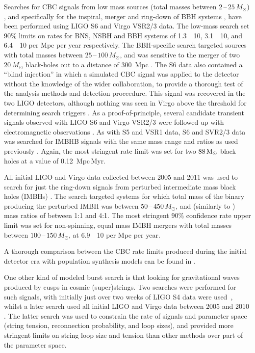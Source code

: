 Searches for CBC signals from low mass sources (total masses between $2$\,--\,$25\,M_{\odot}$) 
\cite{2012PhRvD..85h2002A}, and specifically for the inspiral, merger and ring-down of BBH systems 
\cite{2013PhRvD..87b2002A}, have been performed using LIGO S6 and Virgo VSR2/3 data. The low-mass search set 
90\% limits on rates for BNS, NSBH and BBH systems of 1.3~\texttimes~10, 
3.1~\texttimes~10, and 6.4~\texttimes~10 per Mpc per year respectively. The 
BBH-specific search targeted sources with total masses between $25$\,--\,$100\,M_{\odot}$, and was sensitive 
to the merger of two $20~M_{\odot}$ black-holes out to a distance of 300~Mpc \cite{2013PhRvD..87b2002A}. The 
S6 data also contained a ``blind injection'' in which a simulated CBC signal was applied to the detector 
without the knowledge of the wider collaboration, to provide a thorough test of the analysis methods and 
detection proceedure. This signal was recovered in the two LIGO detectors, although nothing was seen in Virgo 
above the threshold for determining search triggers \cite{2012PhRvD..85h2002A}. As a proof-of-principle,
several candidate transient signals observed with LIGO S6 and Virgo VSR2/3 were followed-up with 
electromagnetic observations \cite{2012A&A...539A.124L, 2012A&A...541A.155A, 2012ApJS..203...28E, 
2014ApJS..211....7A}. As with S5 and VSR1 data, S6 and SVR2/3 data was searched for IMBHB signals with the 
same mass range and ratios as used previously \cite{2014PhRvD..89l2003A}. Again, the most stringent rate 
limit was set for two $88\,{\rm M}_{\odot}$ black holes at a value of 0.12~Mpc\,Myr.

All initial LIGO and Virgo data collected between 2005 and 2011 was used to search for just the ring-down 
signals from perturbed intermediate mass black holes (IMBHs) \cite{2014PhRvD..89j2006A}. The search targeted 
systems for which total mass of the binary producing the perturbed IMBH was between 
$50$\,--\,$450\,M_{\odot}$, and (similarly to \cite{2012PhRvD..85j2004A}) mass ratios of between 1:1 and 4:1. 
The most stringent 90\% confidence rate upper limit was set for non-spinning, equal mass IMBH mergers with 
total masses between $100$\,--\,$150\,M_{\odot}$, at 6.9~\texttimes~10 per Mpc per year.

A thorough comparison between the CBC rate limits produced during the initial detector era with population 
synthesis models can be found in \cite{2016ApJ...819..108B}.

One other kind of modeled burst search is that looking for gravitational waves produced by cusps in cosmic 
(super)strings. Two searches were performed for such signals, with initially just over two weeks of LIGO S4 
data were used~\cite{Abbott:2009j}, whilst a later search used all initial LIGO and Virgo data between 2005 
and 2010 \cite{2014PhRvL.112m1101A}. The latter search \cite{2014PhRvL.112m1101A} was used to constrain the 
rate of signals and parameter space (string tension, reconnection probability, and loop sizes), and provided 
more stringent limits on string loop size and tension than other methods over part of the parameter space.

